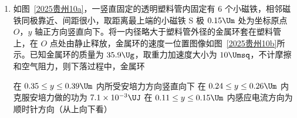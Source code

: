 \documentclass[\gkver]{gaokaozhenti}
\begin{document}
\begin{enumerate}
{即 $U_{2} - U_{1} = p_{1}V_{1} + (-p_{2}V_{2})$

整理得 $U_{1} + p_{1}V_{1} = U_{2} + p_{2}V_{2}$，故 C 正确；

D．内能与温度成正比 $U_{1} = kT_{1}$，$U_{2} = kT_{2}$

根据 $\frac{pV}{T} = C$ 得 $p_{1}V_{1} = CT_{1}$，$p_{2}V_{2} = CT_{2}$

代入方程 $U_{1} + p_{1}V_{1} = U_{2} + p_{2}V_{2}$

得 $kT_{1} + CT_{1} = kT_{2} + CT_{2}$

两边约掉 $(k + C)$ 得 $T_{1} = T_{2}$，故 D 错误。

故选 AC。
}

\item
如图~\ref{2025贵州10a}，一竖直固定的透明塑料管内固定有 6 个小磁铁，相邻磁铁同极靠近、间距很小，取距离最上端的小磁铁 S 极 $0.15 \Um$ 处为坐标原点 $O$，$y$ 轴正方向竖直向下。将一内径略大于塑料管外径的金属环套在塑料管上，在 $O$ 点处由静止释放，金属环的速度一位置图像如图~\ref{2025贵州10b}所示。已知金属环的质量为 $35.9 \Ug$，取重力加速度大小为 $10 \Umsq$，不计摩擦和空气阻力，则下落过程中，金属环


{在 $0.35 \leq y \leq 0.39 \Um$ 内所受安培力方向竖直向下}
{在 $0.24 \leq y \leq 0.26 \Um$ 内克服安培力做的功为 $7.1\times10^{-3} \UJ$}
{在 $0.11 \leq y \leq 0.15 \Um$ 内感应电流方向为顺时针方向（从上向下看）}

\end{enumerate}
\end{document}
